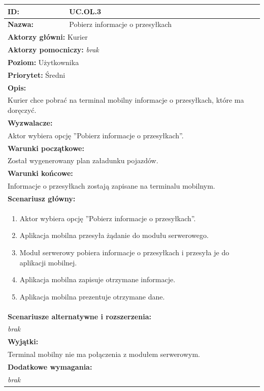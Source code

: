 \begin{center}
\begin{longtable}[h]{|p{1.6cm}|p{13.5cm}|}
\hline
\textbf{ID:} & UC.OL.3 \\ \hline
\textbf{Nazwa:} & Pobierz informacje o przesyłkach \\ \hline
\multicolumn{2}{|p{15.1cm}|}{\textbf{Aktorzy główni:} Kurier} \\
\multicolumn{2}{|p{15.1cm}|}{\textbf{Aktorzy pomocniczy:} \textit{brak}} \\
\multicolumn{2}{|p{15.1cm}|}{\textbf{Poziom:} Użytkownika} \\
\multicolumn{2}{|p{15.1cm}|}{\textbf{Priorytet:} Średni} \\
\hline
\multicolumn{2}{|p{15.1cm}|}{\textbf{Opis:}} \\
\multicolumn{2}{|p{15.1cm}|}{
Kurier chce pobrać na terminal mobilny informacje o przesyłkach, które ma doręczyć.
} \\ \hline
\multicolumn{2}{|p{15.1cm}|}{\textbf{Wyzwalacze:}} \\
\multicolumn{2}{|p{15.1cm}|}{
Aktor wybiera opcję ''Pobierz informacje o przesyłkach''.
} \\ \hline
\multicolumn{2}{|p{15.1cm}|}{\textbf{Warunki początkowe:}} \\
\multicolumn{2}{|p{15.1cm}|}{
Został wygenerowany plan załadunku pojazdów.
} \\ \hline
\multicolumn{2}{|p{15.1cm}|}{\textbf{Warunki końcowe:}} \\
\multicolumn{2}{|p{15.1cm}|}{
Informacje o przesyłkach zostają zapisane na terminalu mobilnym.
} \\ \hline
\multicolumn{2}{|p{15.1cm}|}{\textbf{Scenariusz główny:}} \\
\multicolumn{2}{|p{15.1cm}|}{
\begin{enumerate}
\item Aktor wybiera opcję ''Pobierz informacje o przesyłkach''.
\item Aplikacja mobilna przesyła żądanie do modułu serwerowego.
\item Moduł serwerowy pobiera informacje o przesyłkach i przesyła je do aplikacji mobilnej.
\item Aplikacja mobilna zapisuje otrzymane informacje.
\item Aplikacja mobilna prezentuje otrzymane dane.
\end{enumerate}
} \\ \hline
\multicolumn{2}{|p{15.1cm}|}{\textbf{Scenariusze alternatywne i rozszerzenia:}} \\
\multicolumn{2}{|p{15.1cm}|}{
\textit{brak}
} \\ \hline
\multicolumn{2}{|p{15.1cm}|}{\textbf{Wyjątki:}} \\
\multicolumn{2}{|p{15.1cm}|}{
Terminal mobilny nie ma połączenia z modułem serwerowym.
} \\ \hline
\multicolumn{2}{|p{15.1cm}|}{\textbf{Dodatkowe wymagania:}} \\
\multicolumn{2}{|p{15.1cm}|}{
\textit{brak}
} \\
\hline
\end{longtable}
\end{center}

